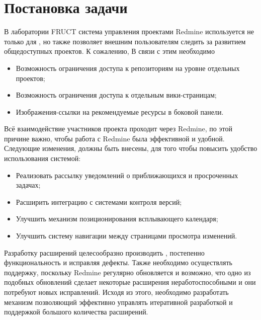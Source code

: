 \section{Постановка задачи}
В лаборатории FRUCT система управления проектами Redmine
используется не только для , но
также позволяет внешним пользователям следить за развитием общедоступных
проектов. К сожалению,  В связи с этим необходимо  

\begin{itemize}
  \item Возможность ограничения доступа к репозиториям на уровне отдельных
  проектов;
  \item Возможность ограничения доступа к отдельным вики-страницам;
  \item Изображения-ссылки на рекомендуемые ресурсы в боковой панели.
\end{itemize} 
   
Всё взаимодействие участников проекта проходит через Redmine, по этой причине
важно, чтобы работа с Redmine была эффективной и удобной. Следующие изменения,
должны быть внесены, для того чтобы повысить удобство использования системой:
\begin{itemize}
  \item Реализовать рассылку уведомлений о приближающихся и просроченных
  задачах;
  \item Расширить интеграцию с системами контроля версий; 
  \item Улучшить механизм позиционирования всплывающего календаря;
  \item Улучшить систему навигации между страницами просмотра изменений.
\end{itemize}

Разработку расширений целесообразно производить , постепенно
 функциональность и исправляя дефекты. Также  необходимо
осуществлять поддержку, поскольку Redmine регулярно обновляется и возможно,
что одно из подобных обновлений сделает некоторые расширения
неработоспособными и они потребуют новых исправлений. Исходя из этого,
необходимо разработать механизм позволяющий эффективно управлять 
итеративной разработкой и поддержкой большого количества расширений.

